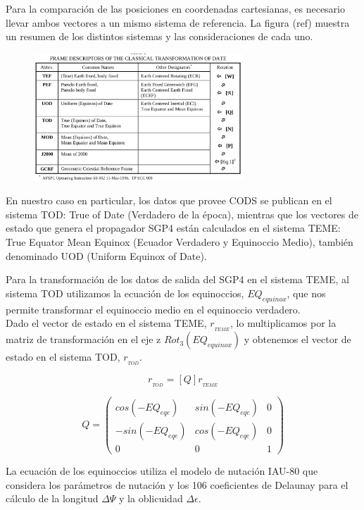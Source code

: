 Para la comparaci\'on de las posiciones en coordenadas cartesianas, es necesario llevar ambos vectores a un mismo sistema de referencia.
La figura (ref) muestra un resumen de los distintos sistemas y las consideraciones de cada uno. 

\begin{figure}[!h]
  \centering
  \includegraphics[width=0.7\textwidth]{imagenes/sistReferencias}
\end{figure}

En nuestro caso en particular, los datos que provee CODS se publican en el sistema TOD: True of Date (Verdadero de la \'epoca), mientras que los vectores de estado que genera el propagador SGP4 est\'an calculados en el sistema TEME: True Equator Mean Equinox (Ecuador Verdadero y Equinoccio Medio), tambi\'en denominado UOD (Uniform Equinox of Date).

Para la transformaci\'on de los datos de salida del SGP4 en el sistema TEME, al sistema TOD utilizamos la ecuaci\'on de los equinoccios, $EQ_{equinox}$, que nos permite transformar el equinoccio medio en el equinoccio verdadero.\\
Dado el vector de estado en el sistema TEME, $r_{_{TEME}}$, lo multiplicamos por la matriz de transformaci\'on en el eje z $Rot_{3}(EQ_{equinox})$ y obtenemos el vector de estado en el sistema TOD, $r_{_{TOD}}$.

\begin{equation}
 r_{_{TOD}} = [Q] r_{_{TEME}}
\end{equation}


 \[ Q =
\left( \begin{array}{ccc}
 cos(-EQ_{eqe}) & sin(-EQ_{eqe}) &  0 \\ 
 -sin(-EQ_{eqe}) & cos(-EQ_{eqe}) &  0 \\
 0 & 0 & 1
\end{array} \right) \] 


La ecuaci\'on de los equinoccios utiliza el modelo de nutaci\'on IAU-80 que considera los par\'ametros de nutaci\'on y los 106 coeficientes de Delaunay para el c\'alculo de la longitud $\Delta \Psi$ y la oblicuidad $\Delta \epsilon$.

